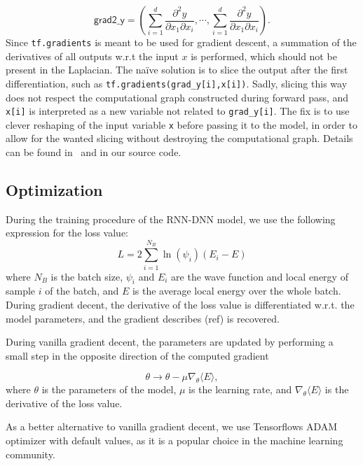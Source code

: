 \begin{equation*}
	\textsf{grad2\_y} = \left(\sum_{i=1}^{d}\frac{\partial^2 y}{\partial x_1 \partial x_i}, \cdots, \sum_{i=1}^{d}\frac{\partial^2 y}{\partial x_1 \partial x_i}\right).
\end{equation*}
Since \texttt{tf.gradients} is meant to be used for gradient
descent, a summation of the derivatives of all outputs w.r.t the input $x$ is
performed, which should not be present in the Laplacian. 
The naïve solution is to slice the output after the first differentiation, such as\newline 
\texttt{tf.gradients(grad_y[i],x[i])}. Sadly, slicing this way does not respect
the computational graph constructed during forward pass, and \texttt{x[i]} is
interpreted as a new variable not related to \texttt{grad_y[i]}. The fix is to
use clever reshaping of the input variable \texttt{x} before passing it to the
model, in order to allow for the wanted slicing without destroying the
computational graph. Details can be found in~\cite{laplace} and in our source code.  

\subsection{Optimization}
During the training procedure of the RNN-DNN model, we use the following expression for the loss value:
\begin{equation*}
	L = 2\sum_{i=1}^{N_B}\ln(\psi_i) (E_i - E)
\end{equation*}
where $N_B$ is the batch size, $\psi_i$ and $E_i$ are the wave function and
local energy of sample $i$ of the batch, and $E$ is the average local energy
over the whole batch. During gradient decent, the derivative of the loss value
is differentiated w.r.t. the model parameters, and the gradient describes (ref)
is recovered. 

During vanilla gradient decent, the parameters are updated by performing a small
step in the opposite direction of the computed gradient 

\begin{equation*}
	\theta \rightarrow \theta - \mu \nabla_\theta \langle E \rangle,
\end{equation*}
where $\theta$ is the parameters of the model, $\mu$ is the learning rate, and $\nabla_\theta \langle E \rangle$ is the derivative of the loss value. 

As a better alternative to vanilla gradient decent, we use Tensorflows ADAM
optimizer with default values, as it is a popular choice in the machine learning
community.   

